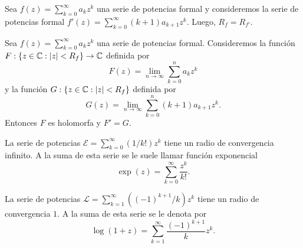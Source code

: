 \begin{theorem}
  Sea $f(z) = \sum_{k = 0}^{\infty} a_k z^k$ una serie de potencias formal y consideremos la
  serie de potencias formal $f'(z) = \sum_{k = 0}^{\infty} (k + 1) a_{k + 1} z^k$. Luego,
  $R_f = R_{f'}$.
\end{theorem}

\begin{theorem}[Derivada]
  Sea $f(z) = \sum_{k = 0}^{\infty} a_k z^k$ una serie de potencias formal. Consideremos la funci\'on
  $F: \{z \in \mathbb C : |z| < R_f\} \to \mathbb C$ definida por
  \[
    F(z) = \lim_{n \to \infty} \sum_{k = 0}^n a_k z^k 
  \]
  y la funci\'on $G: \{z \in \mathbb C : |z| < R_f\}$ definida por
  \[
    G(z) = \lim_{n \to \infty} \sum_{k = 0}^n (k + 1) a_{k + 1}z^k.
  \]
  Entonces $F$ es holomorfa y $F' = G$.
\end{theorem}

 \begin{example}
  La serie de potencias $\mathcal{E} = \sum_{k = 0}^{\infty} (1 / k!) z^k$ tiene un radio de convergencia infinito.
  A la suma de esta serie se le suele llamar funci\'on exponencial
  \[
    \exp(z) = \sum_{k = 0}^{\infty} \frac{z^k}{k!}.
  \]
 \end{example}

 \begin{example}
   La serie de potencias $\mathcal{L} = \sum_{k = 1}^{\infty} ((-1)^{k + 1} / k) z^k$ tiene un radio
   de convergencia $1$.
   A la suma de esta serie se le denota por
   \[
     \log(1 + z) = \sum_{k = 1}^{\infty} \frac{(-1)^{k + 1}}{k} z^k.
   \]
 \end{example}